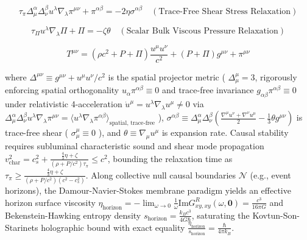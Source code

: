 \documentclass[11pt,a4paper]{article}
\theoremstyle{definition}
\theoremstyle{remark}
\begin{document}
\begin{equation}
\boxed{\tau_\pi \Delta^\alpha_\mu \Delta^\beta_\nu u^\lambda \nabla_\lambda \pi^{\mu\nu} + \pi^{\alpha\beta} = -2\eta \sigma^{\alpha\beta} \quad (\text{Trace-Free Shear Stress Relaxation})}
\end{equation}



\begin{equation}
\boxed{\tau_\Pi u^\lambda \nabla_\lambda \Pi + \Pi = -\zeta \theta \quad (\text{Scalar Bulk Viscous Pressure Relaxation})}
\end{equation}



\begin{equation}
\boxed{T^{\mu\nu} = (\rho c^2 + P + \Pi) \frac{u^\mu u^\nu}{c^2} + (P + \Pi) g^{\mu\nu} + \pi^{\mu\nu}}
\end{equation}


where $\Delta^{\mu\nu} \equiv g^{\mu\nu} + u^\mu u^\nu / c^2$ is the spatial projector metric ( $\Delta^\mu_\mu = 3$, rigorously enforcing spatial orthogonality $u_\alpha \pi^{\alpha\beta} \equiv 0$ and trace-free invariance $g_{\alpha\beta}\pi^{\alpha\beta} \equiv 0$ under relativistic 4-acceleration $\dot{u}^\mu = u^\lambda \nabla_\lambda u^\mu \neq 0$ via $\Delta^\alpha_\mu \Delta^\beta_\nu u^\lambda \nabla_\lambda \pi^{\mu\nu} = \langle u^\lambda \nabla_\lambda \pi^{\alpha\beta} \rangle_{\text{spatial, trace-free}}$ ), $\sigma^{\alpha\beta} \equiv \Delta^\alpha_\mu \Delta^\beta_\nu \left(\frac{\nabla^\mu u^\nu + \nabla^\nu u^\mu}{2} - \frac{1}{3}\theta g^{\mu\nu}\right)$ is trace-free shear ( $\sigma^\mu_\mu \equiv 0$ ), and $\theta \equiv \nabla_\mu u^\mu$ is expansion rate. Causal stability requires subluminal characteristic sound and shear mode propagation $v_{\text{char}}^2 = c_s^2 + \frac{\frac{4}{3}\eta + \zeta}{\left(\rho + P/c^2\right)\tau_\pi} \le c^2$, bounding the relaxation time as $\tau_\pi \ge \frac{\frac{4}{3}\eta + \zeta}{\left(\rho + P/c^2\right)\left(c^2 - c_s^2\right)}$. Along collective null causal boundaries $\mathcal{N}$ (e.g., event horizons), the Damour-Navier-Stokes membrane paradigm yields an effective horizon surface viscosity $\eta_{\text{horizon}} = -\lim_{\omega \to 0} \frac{1}{\omega} \mathrm{Im} G_{xy, xy}^R(\omega, \mathbf{0}) = \frac{c^3}{16\pi G}$ and Bekenstein-Hawking entropy density $s_{\text{horizon}} = \frac{k_B c^3}{4 G \hbar}$, saturating the Kovtun-Son-Starinets holographic bound with exact equality $\frac{\eta_{\text{horizon}}}{s_{\text{horizon}}} = \frac{\hbar}{4\pi k_B}$.
\end{document}
